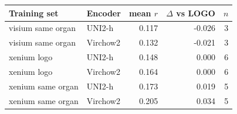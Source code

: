 \begin{tabular}{llrrr}
\toprule
Training set & Encoder & mean $r$ & $\Delta$ vs LOGO & $n$ \\
\midrule
visium same organ & UNI2-h & 0.117 & -0.026 & 3 \\
visium same organ & Virchow2 & 0.132 & -0.021 & 3 \\
xenium logo & UNI2-h & 0.148 & 0.000 & 6 \\
xenium logo & Virchow2 & 0.164 & 0.000 & 6 \\
xenium same organ & UNI2-h & 0.173 & 0.019 & 5 \\
xenium same organ & Virchow2 & 0.205 & 0.034 & 5 \\
\bottomrule
\end{tabular}
